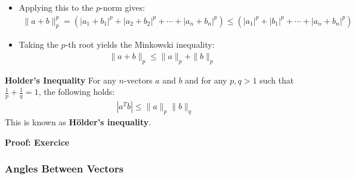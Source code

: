 \begin{frame}
    \begin{itemize}
        \item Applying this to the $p$-norm gives:
        \begin{align*}
            \|a + b\|_p^p = (|a_1 + b_1|^p + |a_2 + b_2|^p + \cdots + |a_n + b_n|^p) \leq (|a_1|^p + |b_1|^p + \cdots + |a_n + b_n|^p)
        \end{align*}
        \item Taking the $p$-th root yields the Minkowski inequality:
        \begin{align*}
            \|a + b\|_p \leq \|a\|_p + \|b\|_p
        \end{align*} 
    \end{itemize}
\end{frame}

\begin{frame}
    \begin{block}{\textbf{Holder's Inequality}}
        For any $n$-vectors $a$ and $b$ and for any $p, q > 1$ such that $\frac{1}{p} + \frac{1}{q} = 1$, the following holds:
        \begin{align}
            |a^T b| \leq \|a\|_p \|b\|_q
        \end{align}
        This is known as \textbf{Hölder's inequality}.
    \end{block}
    \textbf{Proof: Exercice}
\end{frame}


\subsubsection{Angles Between Vectors}


